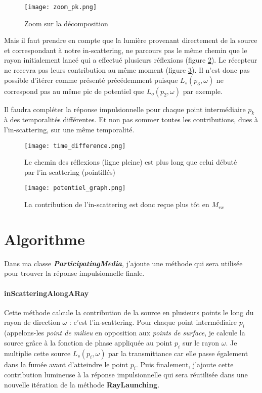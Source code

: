\begin{figure}[h!]
\centering
\texttt{[image: zoom\_pk.png]}
\caption{Zoom sur la décomposition}
\label{fig:zoom_pk}
\end{figure}

Mais il faut prendre en compte que la lumière provenant directement de la source et correspondant à notre in-scattering, ne parcours pas le même chemin que le rayon initialement lancé qui a effectué plusieurs réflexions (figure \ref{fig:different_paths}). Le récepteur ne recevra pas leurs contribution au même moment (figure \ref{fig:different_times}). Il n'est donc pas possible d'itérer comme présenté précédemment puisque $L_s(p_3, \omega)$ ne correspond pas au même pic de potentiel que $L_o(p_2, \omega)$ par exemple.\par
Il faudra compléter la réponse impulsionnelle pour chaque point intermédiaire $p_k$ à des temporalités différentes. Et non pas sommer toutes les contributions, dues à l'in-scattering, sur une même temporalité.

\begin{figure}[h!]
\centering
\texttt{[image: time\_difference.png]}
\caption{Le chemin des réflexions (ligne pleine) est plus long que celui débuté par l'in-scattering (pointillés)}
\label{fig:different_paths}
\end{figure}

\begin{figure}[h!]
\centering
\texttt{[image: potentiel\_graph.png]}
\caption{La contribution de l'in-scattering est donc reçue plus tôt en $M_{rx}$}
\label{fig:different_times}
\end{figure}

\newpage

\section{Algorithme}

Dans ma classe \textit{\textbf{ParticipatingMedia}}, j'ajoute une méthode qui sera utilisée pour trouver la réponse impulsionnelle finale.

\paragraph{inScatteringAlongARay} Cette méthode calcule la contribution de la source en plusieurs points le long du rayon de direction $\omega$ : c'est l'in-scattering. Pour chaque point intermédiaire $p_i$ (appelons-les \textit{point de milieu} en opposition aux \textit{points de surface}, je calcule la source grâce à la fonction de phase appliquée au point $p_i$ sur le rayon $\omega$. Je multiplie cette source $L_s(p_i, \omega)$ par la transmittance car elle passe également dans la fumée avant d'atteindre le point $p_i$. Puis finalement, j'ajoute cette contribution lumineuse à la réponse impulsionnelle qui sera réutilisée dans une nouvelle itération de la méthode \textbf{RayLaunching}. \newline\par

